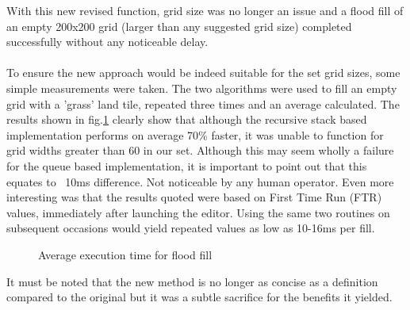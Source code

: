 With this new revised function, grid size was no longer an issue and a flood fill of an empty 200x200 grid (larger than any suggested grid size) completed successfully without any noticeable delay.
\paragraph{}
To ensure the new approach would be indeed suitable for the set grid sizes, some simple measurements were taken.  The two algorithms were used to fill an empty grid with a 'grass' land tile, repeated three times and an average calculated.  The results shown in fig.\ref{fig:floodChart} clearly show that although the recursive stack based implementation performs on average 70\% faster, it was unable to function for grid widths greater than 60 in our set.  Although this may seem wholly a failure for the queue based implementation, it is important to point out that this equates to ~10ms difference. Not noticeable by any human operator.  Even more interesting was that the results quoted were based on First Time Run (FTR) values, immediately after launching the editor. Using the same two routines on subsequent occasions would yield repeated values as low as 10-16ms per fill.
 
\begin{figure}[h]
\centering
{}
\caption{Average execution time for flood fill}
\label{fig:floodChart}
\end{figure}

It must be noted that the new method is no longer as concise as a definition compared to the original but it was a subtle sacrifice for the benefits it yielded.